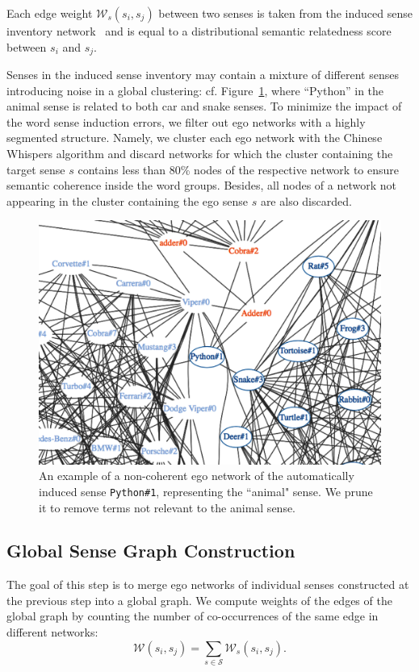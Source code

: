 \documentclass[10pt, a4paper]{article}
\begin{document}
Each edge weight $\mathcal{W}_s(s_i, s_j)$ between two senses is taken from the induced sense inventory network~\cite{Faralli:16} and is equal to a distributional semantic relatedness score between $s_i$ and $s_j$.

Senses in the induced sense inventory may contain a mixture of different senses introducing noise in a global clustering: cf. Figure~\ref{fig:ego-network}, where  ``Python'' in the animal sense is related to both car and snake senses.
To minimize the impact of the word sense induction errors, we filter out ego networks with a highly segmented structure. Namely, we cluster each ego network with the Chinese Whispers algorithm and discard networks for which the cluster containing the target sense $s$ contains less than 80\% nodes of the respective network to ensure semantic coherence inside the word groups. Besides, all nodes of a network not appearing in the cluster containing the ego sense $s$ are also discarded. 

\begin{figure}[ht]
  \centering
  \includegraphics[width=.5\textwidth]{figures/ego-network}
  \caption{An example of a non-coherent ego network  of the automatically induced sense \texttt{Python\#1}, representing the ``animal" sense. We prune it to remove terms not relevant to the animal sense. }
  \label{fig:ego-network}
\end{figure}

\subsection{Global Sense Graph Construction}

The goal of this step is to merge ego networks of individual senses constructed at the previous step into a global graph. We compute weights of the edges of the global graph by counting the number of co-occurrences of the same edge in different networks:
\begin{equation}
  \mathcal{W}(s_i, s_j) = \sum_{s \in \mathcal{S}} \mathcal{W}_s(s_i, s_j)\text{.}
\end{equation}
\end{document}
